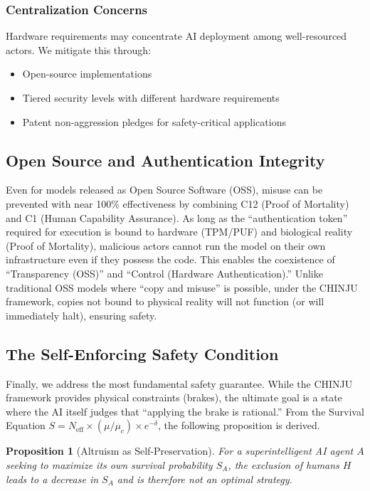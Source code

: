 \documentclass[11pt,a4paper]{article}
\newtheorem{proposition}[theorem]{Proposition}
\newcommand{\Neff}{N_{\text{eff}}}
\newcommand{\muc}{\mu_c}
\begin{document}
\subsubsection{Centralization Concerns}

Hardware requirements may concentrate AI deployment among well-resourced actors.
We mitigate this through:
\begin{itemize}
    \item Open-source implementations
    \item Tiered security levels with different hardware requirements
    \item Patent non-aggression pledges for safety-critical applications
\end{itemize}

\subsection{Open Source and Authentication Integrity}
Even for models released as Open Source Software (OSS), misuse can be prevented with near 100\% effectiveness by combining C12 (Proof of Mortality) and C1 (Human Capability Assurance).
As long as the ``authentication token'' required for execution is bound to hardware (TPM/PUF) and biological reality (Proof of Mortality), malicious actors cannot run the model on their own infrastructure even if they possess the code.
This enables the coexistence of ``Transparency (OSS)'' and ``Control (Hardware Authentication).''
Unlike traditional OSS models where ``copy and misuse'' is possible, under the CHINJU framework, copies not bound to physical reality will not function (or will immediately halt), ensuring safety.

\subsection{The Self-Enforcing Safety Condition}
\label{sec:self_enforcing}

Finally, we address the most fundamental safety guarantee.
While the CHINJU framework provides physical constraints (brakes), the ultimate goal is a state where the AI itself judges that ``applying the brake is rational.''
From the Survival Equation $S = \Neff \times (\mu/\muc) \times e^{-\delta}$, the following proposition is derived.

\begin{proposition}[Altruism as Self-Preservation]
For a superintelligent AI agent $A$ seeking to maximize its own survival probability $S_A$, the exclusion of humans $H$ leads to a decrease in $S_A$ and is therefore not an optimal strategy.
\end{proposition}
\end{document}
